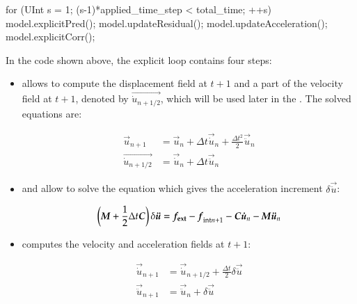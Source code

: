\begin{cpp}
  for (UInt s = 1; (s-1)*applied_time_step < total_time; ++s) {
    model.explicitPred();
    model.updateResidual();
    model.updateAcceleration();
    model.explicitCorr();
  }
\end{cpp}

In the code shown above, the explicit loop contains four steps:
\begin{itemize}
\item {}  allows to  compute the displacement  field at
  $t+1$   and   a  part   of   the  velocity   field   at   $t+1$,  denoted   by
  $\vec{\dot{u}_{n+1/2}}$,    which    will     be    used    later    in    the
  . The solved equations are:

  \begin{align}
    \vec{u}_{n+1}  &= \vec{u}_{n}  + \Delta  t \vec{\dot{u}}_{n}  + \frac{\Delta
      t^2}{2} \vec{\ddot{u}}_{n}\\
    \vec{\dot{u}_{n+1/2}}  &= \vec{\dot{u}}_{n} +  \Delta t  \vec{\ddot{u}}_{n}
    \label{eqn:smm:explicit:onehalfvelocity}
  \end{align}

\item {}  and  allow
  to  solve  the  equation   which  gives  the  acceleration  increment  $\delta
  \vec{\ddot{u}}$:

  \begin{equation}
    \left(\boldsymbol{M}  +  \frac{1}{2}  \Delta  t \boldsymbol{C}\right)  \delta  \boldsymbol{\ddot{u}}  =
    \boldsymbol{f_{{\mathrm{ext}}}} -  \boldsymbol{f}_{{\mathrm{int}}n+1} - \boldsymbol{C}  \boldsymbol{\dot{u}}_{n} -
    \boldsymbol{M} \boldsymbol{\ddot{u}}_{n}
  \end{equation}


\item {} computes  the velocity and acceleration fields
  at $t+1$:

  \begin{align}
    \vec{\dot{u}}_{n+1}  &= \vec{\dot{u}}_{n+1/2} + \frac{\Delta t}{2} \delta \vec{\ddot{u}} \\
    \vec{\ddot{u}}_{n+1}  &= \vec{\ddot{u}}_{n} +  \delta \vec{\ddot{u}}
  \end{align}
\end{itemize}


